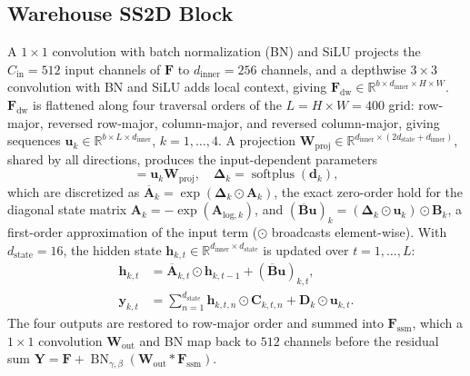 \subsection{Warehouse SS2D Block}
\label{sec:mamba_integration}
A $1 \times 1$ convolution with batch normalization (BN) and SiLU projects the $C_{\text{in}} = 512$ input channels of $\mathbf{F}$ to $d_{\text{inner}} = 256$ channels, and a depthwise $3 \times 3$ convolution with BN and SiLU adds local context, giving $\mathbf{F}_{\text{dw}} \in \mathbb{R}^{b \times d_{\text{inner}} \times H \times W}$. $\mathbf{F}_{\text{dw}}$ is flattened along four traversal orders of the $L = H \times W = 400$ grid: row-major, reversed row-major, column-major, and reversed column-major, giving sequences $\mathbf{u}_k \in \mathbb{R}^{b \times L \times d_{\text{inner}}}$, $k = 1, \dots, 4$. A projection $\mathbf{W}_{\text{proj}} \in \mathbb{R}^{d_{\text{inner}} \times (2 d_{\text{state}} + d_{\text{inner}})}$, shared by all directions, produces the input-dependent parameters
\begin{equation}
    [\mathbf{B}_k, \mathbf{C}_k, \mathbf{d}_k] = \mathbf{u}_k \mathbf{W}_{\text{proj}}, \quad \boldsymbol{\Delta}_k = \operatorname{softplus}(\mathbf{d}_k),
\end{equation}
which are discretized as $\overline{\mathbf{A}}_k = \exp(\boldsymbol{\Delta}_k \odot \mathbf{A}_k)$, the exact zero-order hold for the diagonal state matrix $\mathbf{A}_k = -\exp(\mathbf{A}_{\text{log}, k})$, and $(\overline{\mathbf{B}}\mathbf{u})_k = (\boldsymbol{\Delta}_k \odot \mathbf{u}_k) \odot \mathbf{B}_k$, a first-order approximation of the input term ($\odot$ broadcasts element-wise). With $d_{\text{state}} = 16$, the hidden state $\mathbf{h}_{k,t} \in \mathbb{R}^{d_{\text{inner}} \times d_{\text{state}}}$ is updated over $t = 1, \dots, L$:
\begin{align}
    \mathbf{h}_{k,t} &= \overline{\mathbf{A}}_{k,t} \odot \mathbf{h}_{k,t-1} + (\overline{\mathbf{B}}\mathbf{u})_{k,t}, \\
    \mathbf{y}_{k,t} &= \textstyle\sum_{n=1}^{d_{\text{state}}} \mathbf{h}_{k,t,n} \odot \mathbf{C}_{k,t,n} + \mathbf{D}_k \odot \mathbf{u}_{k,t}.
\end{align}
The four outputs are restored to row-major order and summed into $\mathbf{F}_{\text{ssm}}$, which a $1 \times 1$ convolution $\mathbf{W}_{\text{out}}$ and BN map back to $512$ channels before the residual sum $\mathbf{Y} = \mathbf{F} + \operatorname{BN}_{\gamma, \beta}(\mathbf{W}_{\text{out}} * \mathbf{F}_{\text{ssm}})$.

